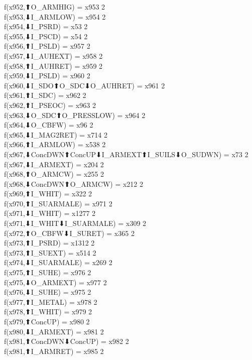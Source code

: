 f(x952,⬆O_ARMHIG) = x953 {2} \\
f(x953,⬇I_ARMLOW) = x954 {2} \\
f(x954,⬇I_PSRD) = x53 {2} \\
f(x955,⬇I_PSCD) = x54 {2} \\
f(x956,⬆I_PSLD) = x957 {2} \\
f(x957,⬇I_AUHEXT) = x958 {2} \\
f(x958,⬆I_AUHRET) = x959 {2} \\
f(x959,⬇I_PSLD) = x960 {2} \\
f(x960,⬇I_SDO⬆O_SDC⬇O_AUHRET) = x961 {2} \\
f(x961,⬆I_SDC) = x962 {2} \\
f(x962,⬆I_PSEOC) = x963 {2} \\
f(x963,⬇O_SDC⬆O_PRESSLOW) = x964 {2} \\
f(x964,⬇O_CBFW) = x96 {2} \\
f(x965,⬇I_MAG2RET) = x714 {2} \\
f(x966,⬆I_ARMLOW) = x538 {2} \\
f(x967,⬇ConcDWN⬆ConcUP⬇I_ARMEXT⬆I_SUILS⬇O_SUDWN) = x73 {2} \\
f(x967,⬇I_ARMEXT) = x204 {2} \\
f(x968,⬆O_ARMCW) = x255 {2} \\
f(x968,⬇ConcDWN⬆O_ARMCW) = x212 {2} \\
f(x969,⬆I_WHIT) = x322 {2} \\
f(x970,⬆I_SUARMALE) = x971 {2} \\
f(x971,⬇I_WHIT) = x1277 {2} \\
f(x971,⬇I_WHIT⬇I_SUARMALE) = x309 {2} \\
f(x972,⬆O_CBFW⬇I_SURET) = x365 {2} \\
f(x973,⬆I_PSRD) = x1312 {2} \\
f(x973,⬆I_SUEXT) = x514 {2} \\
f(x974,⬇I_SUARMALE) = x269 {2} \\
f(x975,⬆I_SUHE) = x976 {2} \\
f(x975,⬇O_ARMEXT) = x977 {2} \\
f(x976,⬇I_SUHE) = x975 {2} \\
f(x977,⬆I_METAL) = x978 {2} \\
f(x978,⬆I_WHIT) = x979 {2} \\
f(x979,⬆ConcUP) = x980 {2} \\
f(x980,⬇I_ARMEXT) = x981 {2} \\
f(x981,⬆ConcDWN⬇ConcUP) = x982 {2} \\
f(x981,⬆I_ARMRET) = x985 {2} \\
